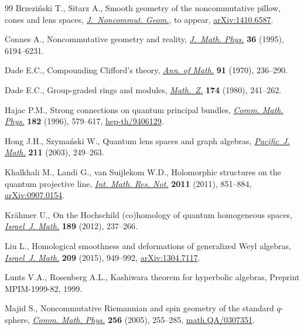 \documentclass[10pt,a4paper]{amsart}
\numberwithin{equation}{section}
\begin{document}
\begin{thebibliography}{99}
Brzezi{\'n}ski T., Sitarz A., Smooth geometry of the noncommutative pillow,
 cones and lens spaces, \href{http://dx.doi.org/10.4171/JNCG/56}{\textit{J.~Noncommut. Geom.}}, {t}o appear,
 \href{http://arxiv.org/abs/1410.6587}{arXiv:1410.6587}.

Connes A., Noncommutative geometry and reality, \href{http://dx.doi.org/10.1063/1.531241}{\textit{J.~Math. Phys.}}
 \textbf{36} (1995), 6194--6231.

Dade E.C., Compounding {C}lif\/ford's theory, \href{http://dx.doi.org/10.2307/1970606}{\textit{Ann. of Math.}} \textbf{91}
 (1970), 236--290.

Dade E.C., Group-graded rings and modules, \href{http://dx.doi.org/10.1007/BF01161413}{\textit{Math.~Z.}} \textbf{174}
 (1980), 241--262.

Hajac P.M., Strong connections on quantum principal bundles, \href{http://dx.doi.org/10.1007/BF02506418}{\textit{Comm.
 Math. Phys.}} \textbf{182} (1996), 579--617, \href{http://arxiv.org/abs/hep-th/9406129}{hep-th/9406129}.

Hong J.H., Szyma{\'n}ski W., Quantum lens spaces and graph algebras,
 \href{http://dx.doi.org/10.2140/pjm.2003.211.249}{\textit{Pacific~J. Math.}} \textbf{211} (2003), 249--263.

Khalkhali M., Landi G., van Suijlekom W.D., Holomorphic structures on the
 quantum projective line, \href{http://dx.doi.org/10.1093/imrn/rnq097}{\textit{Int. Math. Res. Not.}} \textbf{2011} (2011),
 851--884, \href{http://arxiv.org/abs/0907.0154}{arXiv:0907.0154}.

Kr{\"a}hmer U., On the {H}ochschild (co)homology of quantum homogeneous spaces,
 \href{http://dx.doi.org/10.1007/s11856-011-0168-4}{\textit{Israel~J. Math.}} \textbf{189} (2012), 237--266.

Liu L., Homological smoothness and deformations of generalized {W}eyl algebras,
 \href{http://dx.doi.org/10.1007/s11856-015-1242-0}{\textit{Israel~J. Math.}} \textbf{209} (2015), 949--992, \href{http://arxiv.org/abs/1304.7117}{arXiv:1304.7117}.

Lunts V.A., Rosenberg A.L., Kashiwara theorem for hyperbolic algebras,
 {P}reprint MPIM-1999-82, 1999.

Majid S., Noncommutative {R}iemannian and spin geometry of the standard
 {$q$}-sphere, \href{http://dx.doi.org/10.1007/s00220-005-1295-8}{\textit{Comm. Math. Phys.}} \textbf{256} (2005), 255--285,
 \href{http://arxiv.org/abs/math.QA/0307351}{math.QA/0307351}.


\end{thebibliography}
\end{document}
